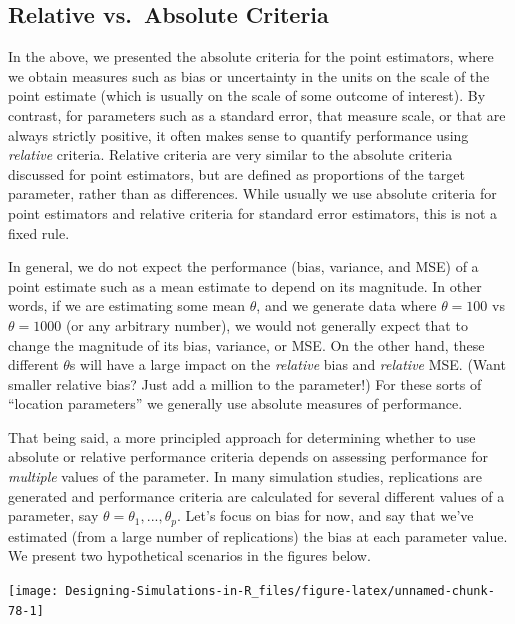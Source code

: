 \documentclass[
]{book}
\begin{document}
\hypertarget{sec_relative_performance}{%
\subsection{Relative vs.~Absolute Criteria}\label{sec_relative_performance}}

In the above, we presented the absolute criteria for the point estimators, where we obtain measures such as bias or uncertainty in the units on the scale of the point estimate (which is usually on the scale of some outcome of interest).
By contrast, for parameters such as a standard error, that measure scale, or that are always strictly positive, it often makes sense to quantify performance using \emph{relative} criteria.
Relative criteria are very similar to the absolute criteria discussed for point estimators, but are defined as proportions of the target parameter, rather than as differences.
While usually we use absolute criteria for point estimators and relative criteria for standard error estimators, this is not a fixed rule.

In general, we do not expect the performance (bias, variance, and MSE) of a point estimate such as a mean estimate to depend on its magnitude.
In other words, if we are estimating some mean \(\theta\), and we generate data where \(\theta = 100\) vs \(\theta = 1000\) (or any arbitrary number), we would not generally expect that to change the magnitude of its bias, variance, or MSE.
On the other hand, these different \(\theta\)s will have a large impact on the \emph{relative} bias and \emph{relative} MSE.
(Want smaller relative bias? Just add a million to the parameter!)
For these sorts of ``location parameters'' we generally use absolute measures of performance.

That being said, a more principled approach for determining whether to use absolute or relative performance criteria depends on assessing performance for \emph{multiple} values of the parameter.
In many simulation studies, replications are generated and performance criteria are calculated for several different values of a parameter, say \(\theta = \theta_1,...,\theta_p\).
Let's focus on bias for now, and say that we've estimated (from a large number of replications) the bias at each parameter value.
We present two hypothetical scenarios in the figures below.

\begin{center}\texttt{[image: Designing-Simulations-in-R\_files/figure-latex/unnamed-chunk-78-1]} \end{center}
\end{document}

